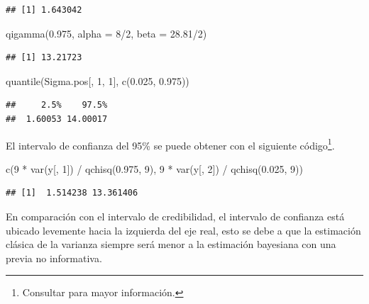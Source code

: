 \documentclass[
  10pt,
  spanish,
]{book}
\newenvironment{Shaded}{\begin{snugshade}}{\end{snugshade}}
\newcommand{\AttributeTok}[1]{\textcolor[rgb]{0.77,0.63,0.00}{#1}}
\newcommand{\DecValTok}[1]{\textcolor[rgb]{0.00,0.00,0.81}{#1}}
\newcommand{\FloatTok}[1]{\textcolor[rgb]{0.00,0.00,0.81}{#1}}
\newcommand{\FunctionTok}[1]{\textcolor[rgb]{0.00,0.00,0.00}{#1}}
\newcommand{\NormalTok}[1]{#1}
\newcommand{\SpecialCharTok}[1]{\textcolor[rgb]{0.00,0.00,0.00}{#1}}
\theoremstyle{definition}
\theoremstyle{definition}
\theoremstyle{definition}
\theoremstyle{definition}
\theoremstyle{remark}
\begin{document}
\begin{verbatim}
## [1] 1.643042
\end{verbatim}

\begin{Shaded}
\begin{Highlighting}[]
\FunctionTok{qigamma}\NormalTok{(}\FloatTok{0.975}\NormalTok{, }\AttributeTok{alpha =} \DecValTok{8}\SpecialCharTok{/}\DecValTok{2}\NormalTok{, }\AttributeTok{beta =} \FloatTok{28.81}\SpecialCharTok{/}\DecValTok{2}\NormalTok{)}
\end{Highlighting}
\end{Shaded}

\begin{verbatim}
## [1] 13.21723
\end{verbatim}

\begin{Shaded}
\begin{Highlighting}[]
\FunctionTok{quantile}\NormalTok{(Sigma.pos[, }\DecValTok{1}\NormalTok{, }\DecValTok{1}\NormalTok{], }\FunctionTok{c}\NormalTok{(}\FloatTok{0.025}\NormalTok{, }\FloatTok{0.975}\NormalTok{))}
\end{Highlighting}
\end{Shaded}

\begin{verbatim}
##     2.5%    97.5% 
##  1.60053 14.00017
\end{verbatim}

El intervalo de confianza del 95\% se puede obtener con el siguiente código\footnote{Consultar \citet[sección.3.2.1]{Zhang} para mayor información.}.

\begin{Shaded}
\begin{Highlighting}[]
\FunctionTok{c}\NormalTok{(}\DecValTok{9} \SpecialCharTok{*} \FunctionTok{var}\NormalTok{(y[, }\DecValTok{1}\NormalTok{]) }\SpecialCharTok{/} \FunctionTok{qchisq}\NormalTok{(}\FloatTok{0.975}\NormalTok{, }\DecValTok{9}\NormalTok{), }
  \DecValTok{9} \SpecialCharTok{*} \FunctionTok{var}\NormalTok{(y[, }\DecValTok{2}\NormalTok{]) }\SpecialCharTok{/} \FunctionTok{qchisq}\NormalTok{(}\FloatTok{0.025}\NormalTok{, }\DecValTok{9}\NormalTok{))}
\end{Highlighting}
\end{Shaded}

\begin{verbatim}
## [1]  1.514238 13.361406
\end{verbatim}

En comparación con el intervalo de credibilidad, el intervalo de confianza está ubicado levemente hacia la izquierda del eje real, esto se debe a que la estimación clásica de la varianza siempre será menor a la estimación bayesiana con una previa no informativa.
\end{document}
